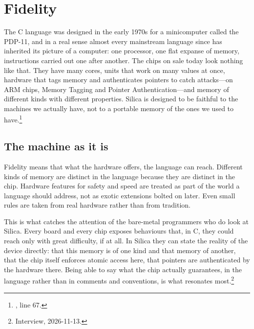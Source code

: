 \chapter{Fidelity}
\label{ch:machines}

The C language was designed in the early 1970s for a minicomputer called the
PDP-11, and in a real sense almost every mainstream language since has
inherited its picture of a computer: one processor, one flat expanse of memory,
instructions carried out one after another. The chips on sale today look
nothing like that. They have many cores, units that work on many values at
once, hardware that tags memory and authenticates pointers to catch
attacks---on ARM chips, Memory Tagging and Pointer Authentication---and memory
of different kinds with different properties. Silica is designed to be faithful
to the machines we actually have, not to a portable memory of the ones we
used to have.\footnote{, line 67.}

\section{The machine as it is}

Fidelity means that what the hardware offers, the language can reach. Different
kinds of memory are distinct in the language because they are distinct in the
chip. Hardware features for safety and speed are treated as part of the world a
language should address, not as exotic extensions bolted on later. Even small
rules are taken from real hardware rather than from tradition.

This is what catches the attention of the bare-metal programmers who do look at
Silica. Every board and every chip exposes behaviours that, in C, they could
reach only with great difficulty, if at all. In Silica they can state the
reality of the device directly: that this memory is of one kind and that memory
of another, that the chip itself enforces atomic access here, that pointers are
authenticated by the hardware there. Being able to say what the chip actually
guarantees, in the language rather than in comments and conventions, is what
resonates most.\footnote{Interview, 2026-11-13.}

